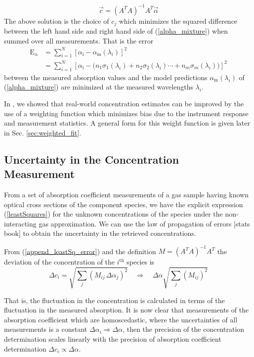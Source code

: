 \documentclass[12pt]{report}
\begin{document}
	\begin{equation}\label{leastSquares}
		\vec{c} = (A^T A)^{-1} A^T \vec{\alpha}
	\end{equation}
	The above solution is the choice of $c_j$ which minimizes the squared difference between the left hand side and right hand side of (\ref{alpha_mixture}) when summed over all measurements. That is the error
	\begin{align} \label{error_alpha}
		\mathrm{E}_\alpha &= \sum_{i=1}^{N} \left[\alpha_\mathrm{i} - \alpha_\mathrm{m}\left(\lambda_i\right) \right]^2 \nonumber \\ 
		&= \sum_{i=1}^{N} \left[\alpha_\mathrm{i} - \Big(n_1 \sigma_1(\lambda_i) + n_2 \sigma_2(\lambda_i) \cdots + n_m \sigma_m(\lambda_i) \Big) \right]^2
	\end{align}
	between the measured absorption values and the model predictions $\alpha_\mathrm{m}\left(\lambda_i\right)$ of (\ref{alpha_mixture}) are minimized at the measured wavelengths $\lambda_i$.
	
	In \cite{mine_acetone}, we showed that real-world concentration estimates can be improved by the use of a weighting function which minimizes bias due to the instrument response and measurement statistics. A general form for this weight function is given later in Sec. \ref{sec:weighted_fit}.
	
	\subsection{Uncertainty in the Concentration Measurement}
	From a set of absorption coefficient measurements of a gas sample having known optical cross sections of the component species, we have the explicit expression (\ref{leastSquares}) for the unknown concentrations of the species under the non-interacting gas approximation. We can use the law of propagation of errors [stats book] to obtain the uncertainty in the retrieved concentrations.
	
	From (\ref{append_leastSq_error}) and the definition $M = (A^T A)^{-1} A^T$  the deviation of the concentration of the $i^\mathrm{th}$ species is
	\begin{equation} \label{error_conc_alpha}
		\Delta {c_i} = \sqrt{\sum_j \left(M_{ij} \, \Delta {\alpha_j}\right)^2} \quad \Rightarrow \quad \Delta \alpha \sqrt{\sum_j \left(M_{ij} \right)^2}
	\end{equation}
	
	That is, the fluctuation in the concentration is calculated in terms of the fluctuation in the measured absorption. It is now clear that measurements of the absorption coefficient which are homoscedastic, where the uncertainties of all measurements is a constant $\Delta \alpha_i \Rightarrow \Delta \alpha$, then the precision of the concentration determination scales linearly with the precision of absorption coefficient determination $\Delta c_i \propto \Delta \alpha$.
	
\end{document}
